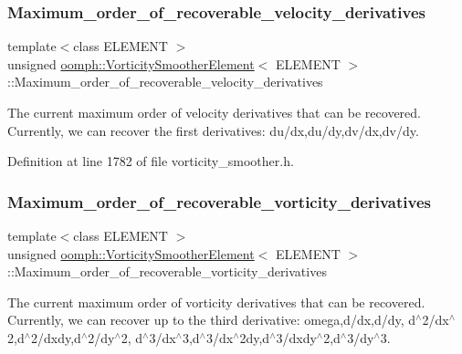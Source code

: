 \subsubsection{\texorpdfstring{Maximum\+\_\+order\+\_\+of\+\_\+recoverable\+\_\+velocity\+\_\+derivatives}{Maximum\_order\_of\_recoverable\_velocity\_derivatives}}
{\footnotesize\ttfamily template$<$class E\+L\+E\+M\+E\+NT $>$ \\
unsigned \hyperlink{classoomph_1_1VorticitySmootherElement}{oomph\+::\+Vorticity\+Smoother\+Element}$<$ E\+L\+E\+M\+E\+NT $>$\+::Maximum\+\_\+order\+\_\+of\+\_\+recoverable\+\_\+velocity\+\_\+derivatives\hspace{0.3cm}{\ttfamily [private]}}



The current maximum order of velocity derivatives that can be recovered. Currently, we can recover the first derivatives\+: du/dx,du/dy,dv/dx,dv/dy. 



Definition at line 1782 of file vorticity\+\_\+smoother.\+h.

\mbox{\label{classoomph_1_1VorticitySmootherElement_a7753f3129fb23347ef757af45cc7b221}} 
\subsubsection{\texorpdfstring{Maximum\+\_\+order\+\_\+of\+\_\+recoverable\+\_\+vorticity\+\_\+derivatives}{Maximum\_order\_of\_recoverable\_vorticity\_derivatives}}
{\footnotesize\ttfamily template$<$class E\+L\+E\+M\+E\+NT $>$ \\
unsigned \hyperlink{classoomph_1_1VorticitySmootherElement}{oomph\+::\+Vorticity\+Smoother\+Element}$<$ E\+L\+E\+M\+E\+NT $>$\+::Maximum\+\_\+order\+\_\+of\+\_\+recoverable\+\_\+vorticity\+\_\+derivatives\hspace{0.3cm}{\ttfamily [private]}}



The current maximum order of vorticity derivatives that can be recovered. Currently, we can recover up to the third derivative\+: omega,d/dx,d/dy, d$^\wedge$2/dx$^\wedge$2,d$^\wedge$2/dxdy,d$^\wedge$2/dy$^\wedge$2, d$^\wedge$3/dx$^\wedge$3,d$^\wedge$3/dx$^\wedge$2dy,d$^\wedge$3/dxdy$^\wedge$2,d$^\wedge$3/dy$^\wedge$3. 



